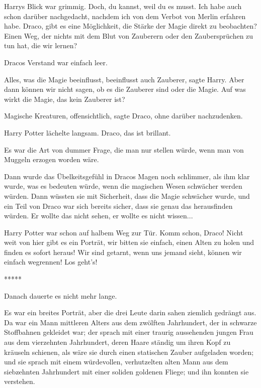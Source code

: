 Harrys Blick war grimmig. \glqq Doch, du kannst, weil du es musst. Ich habe auch
schon darüber nachgedacht, nachdem ich von dem Verbot von Merlin erfahren habe.
Draco, gibt es eine Möglichkeit, die Stärke der Magie direkt zu beobachten?
Einen Weg, der nichts mit dem Blut von Zauberern oder den Zaubersprüchen zu tun
hat, die wir lernen?\grqq{}

Dracos Verstand war einfach leer.

\glqq Alles, was die Magie beeinflusst, beeinflusst auch Zauberer\grqq{}, sagte
Harry. \glqq Aber dann können wir nicht sagen, ob es die Zauberer sind oder die
Magie. Auf was wirkt die Magie, das kein Zauberer ist?\grqq{}

\glqq Magische Kreaturen, offensichtlich\grqq{}, sagte Draco, ohne darüber
nachzudenken.

Harry Potter lächelte langsam. \glqq Draco, das ist brillant.\grqq{}

Es war die Art von dummer Frage, die man nur stellen würde, wenn man von Muggeln
erzogen worden wäre.

Dann wurde das Übelkeitsgefühl in Dracos Magen noch schlimmer, als ihm klar
wurde, was es bedeuten würde, wenn die magischen Wesen schwächer werden würden.
Dann wüssten sie mit Sicherheit, dass die Magie schwächer wurde, und ein Teil
von Draco war sich bereits sicher, dass sie genau das herausfinden würden. Er
wollte das nicht sehen, er wollte es nicht wissen...

Harry Potter war schon auf halbem Weg zur Tür. \glqq Komm schon, Draco! Nicht
weit von hier gibt es ein Porträt, wir bitten sie einfach, einen Alten zu holen
und finden es sofort heraus! Wir sind getarnt, wenn uns jemand sieht, können wir
einfach wegrennen! Los geht's!\grqq{}

\begin{center}*****\end{center}

Danach dauerte es nicht mehr lange.

Es war ein breites Porträt, aber die drei Leute darin sahen ziemlich gedrängt
aus. Da war ein Mann mittleren Alters aus dem zwölften Jahrhundert, der in
schwarze Stoffbahnen gekleidet war; der sprach mit einer traurig aussehenden
jungen Frau aus dem vierzehnten Jahrhundert, deren Haare ständig um ihren Kopf
zu kräuseln schienen, als wäre sie durch einen statischen Zauber aufgeladen
worden; und sie sprach mit einem würdevollen, verhutzelten alten Mann aus dem
siebzehnten Jahrhundert mit einer soliden goldenen Fliege; und ihn konnten sie
verstehen.

